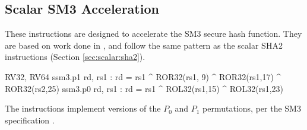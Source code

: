 
\subsection{Scalar SM3 Acceleration}
\label{sec:scalar:sm3}

These instructions are designed to accelerate the SM3 secure
hash function\cite{ietf:sm3}.
They are based on work done in \cite{MJS:LWSHA:20}, and follow
the same pattern as the scalar SHA2 instructions
(Section \ref{sec:scalar:sha2}).

\begin{cryptoisa}
RV32, RV64
    ssm3.p1 rd, rs1 : rd = rs1 ^ ROR32(rs1, 9) ^ ROR32(rs1,17) ^ ROR32(rs2,25)
    ssm3.p0 rd, rs1 : rd = rs1 ^ ROL32(rs1,15) ^ ROL32(rs1,23)
\end{cryptoisa}

The instructions implement versions of the $P_0$ and $P_1$
permutations, per the SM3 specification \cite{ietf:sm3}.

